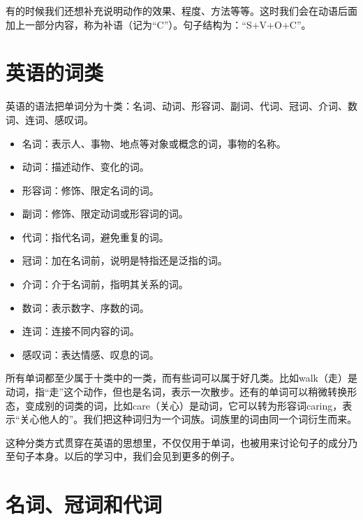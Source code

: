\documentclass[10.5pt, a4paper]{ctexbook} %
\begin{document}
有的时候我们还想补充说明动作的效果、程度、方法等等。这时我们会在动语后面加上一部分内容，称为补语（记为“C”）。句子结构为：“S\;+\;V\;+\;O\;+\;C”。

\begin{liju}
\end{liju}

\section{英语的词类}

英语的语法把单词分为十类：名词、动词、形容词、副词、代词、冠词、介词、数词、连词、感叹词。

\begin{itemize}
    \item 名词：表示人、事物、地点等对象或概念的词，事物的名称。
    \item 动词：描述动作、变化的词。
    \item 形容词：修饰、限定名词的词。
    \item 副词：修饰、限定动词或形容词的词。
    \item 代词：指代名词，避免重复的词。
    \item 冠词：加在名词前，说明是特指还是泛指的词。
    \item 介词：介于名词前，指明其关系的词。
    \item 数词：表示数字、序数的词。
    \item 连词：连接不同内容的词。
    \item 感叹词：表达情感、叹息的词。
\end{itemize}

所有单词都至少属于十类中的一类，而有些词可以属于好几类。比如walk（走）是动词，指“走”这个动作，但也是名词，表示一次散步。还有的单词可以稍微转换形态，变成别的词类的词，比如care（关心）是动词，它可以转为形容词caring，表示“关心他人的”。我们把这种词归为一个词族。词族里的词由同一个词衍生而来。

这种分类方式贯穿在英语的思想里，不仅仅用于单词，也被用来讨论句子的成分乃至句子本身。以后的学习中，我们会见到更多的例子。

\section{名词、冠词和代词}
\end{document}
